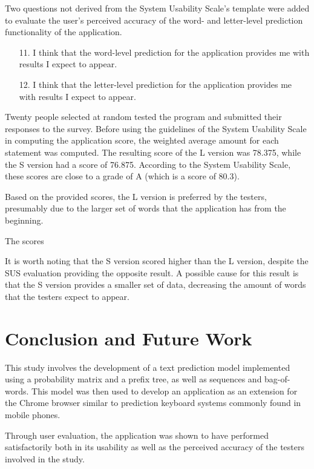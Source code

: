 \documentclass[journal]{./IEEE/IEEEtran}
\begin{document}
Two questions not derived from the System Usability Scale's template were added to evaluate the user's perceived accuracy of the word- and letter-level prediction functionality of the application.

\begin{enumerate}{}

\item[11.] I think that the word-level prediction for the application provides me with results I expect to appear.

\item[12.] I think that the letter-level prediction for the application provides me with results I expect to appear.

\end{enumerate}

Twenty people selected at random tested the program and submitted their responses to the survey. Before using the guidelines of the System Usability Scale in computing the application score, the weighted average amount for each statement was computed. The resulting score of the L version was 78.375, while the S version had a score of 76.875. According to the System Usability Scale, these scores are close to a grade of A (which is a score of 80.3). 

Based on the provided scores, the L version is preferred by the testers, presumably due to the larger set of words that the application has from the beginning.

The scores 


It is worth noting that the S version scored higher than the L version, despite the SUS evaluation providing the opposite result. A possible cause for this result is that the S version provides a smaller set of data, decreasing the amount of words that the testers expect to appear.

\section{Conclusion and Future Work}
This study involves the development of a text prediction model implemented using a probability matrix and a prefix tree, as well as sequences and bag-of-words. This model was then used to develop an application as an extension for the Chrome browser similar to prediction keyboard systems commonly found in mobile phones.

Through user evaluation, the application was shown to have performed satisfactorily both in its usability as well as the perceived accuracy of the testers involved in the study.
\end{document}
